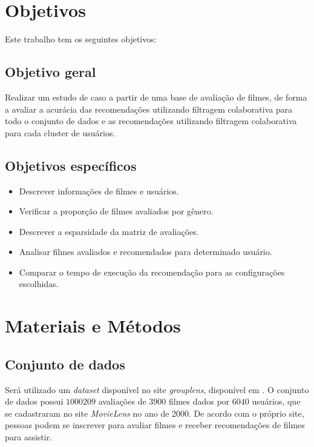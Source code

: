 \documentclass[12pt,a4paper,header]{abnt}
\begin{document}
\chapter{Objetivos}

Este trabalho tem os seguintes objetivos:

\section{Objetivo geral}

Realizar um estudo de caso a partir de uma base de avaliação de filmes, de forma a avaliar a acurácia das recomendações utilizando filtragem colaborativa para todo o conjunto de dados e as recomendações utilizando filtragem colaborativa para cada cluster de usuários.

\section{Objetivos específicos}

\begin{itemize}

\item{Descrever informações de filmes e usuários.}
\item{Verificar a proporção de filmes avaliados por gênero.}
\item{Descrever a esparsidade da matriz de avaliações.}
\item{Analisar filmes avaliados e recomendados para determinado usuário.}
\item{Comparar o tempo de execução da recomendação para as configurações escolhidas.}

\end{itemize}

\chapter{Materiais e Métodos}

\section{Conjunto de dados}

Será utilizado um \textit{dataset} disponível no site \textit{grouplens}, disponível em . O conjunto de dados possui $\num{1000209}$ avaliações de $3900$ filmes dados por $6040$ usuários\cite{harper2016movielens}, que se cadastraram no site \textit{MovieLens} no ano de 2000. De acordo com o próprio site, pessoas podem se inscrever para avaliar filmes e receber recomendações de filmes para assistir.
\end{document}
